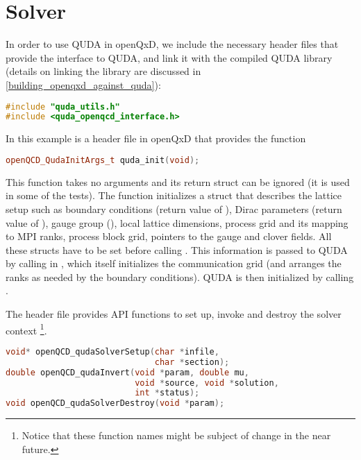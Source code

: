 \chapter{Solver}
\label{ch:p1:solver}

In order to use QUDA in openQxD, we 
 include the necessary header files that provide the interface to QUDA, and link it with the compiled QUDA library (details on linking the library are discussed in \cref{building_openqxd_against_quda}):

\begin{lstlisting}[language=C++]
#include "quda_utils.h"
#include <quda_openqcd_interface.h>
\end{lstlisting}

In this example  is a header file in openQxD that provides the function
\begin{lstlisting}[language=C++]
openQCD_QudaInitArgs_t quda_init(void);
\end{lstlisting}
This function takes no arguments and its return struct can be ignored (it is used in some of the tests). The function initializes a struct that describes the lattice setup such as boundary conditions (return value of ), Dirac parameters (return value of ), gauge group (), local lattice dimensions, process grid and its mapping to MPI ranks, process block grid, pointers to the gauge and clover fields. All these structs have to be set before calling . This information is passed to QUDA by calling  in , which itself initializes the communication grid (and arranges the ranks as needed by the boundary conditions). QUDA is then initialized by calling .

The header file  provides API functions to set up, invoke and destroy the solver context \footnote{Notice that these function names might be subject of change in the near future.}.

\begin{lstlisting}[language=C++]
void* openQCD_qudaSolverSetup(char *infile,
                              char *section);
double openQCD_qudaInvert(void *param, double mu,
                          void *source, void *solution,
                          int *status);
void openQCD_qudaSolverDestroy(void *param);
\end{lstlisting}

